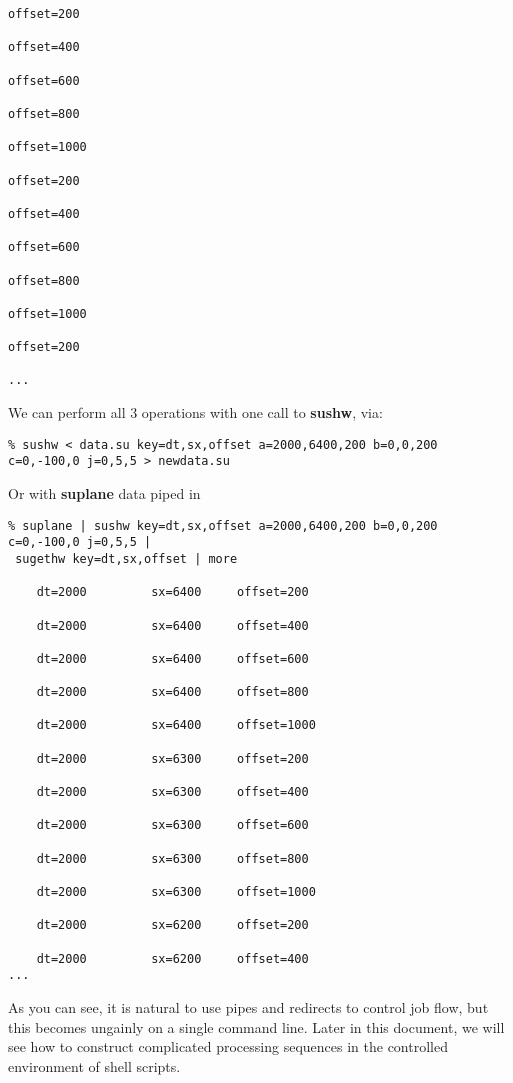{{{{\begin{verbatim}
offset=200      

offset=400      

offset=600      

offset=800      

offset=1000     

offset=200      

offset=400      

offset=600      

offset=800      

offset=1000     

offset=200      

...
\end{verbatim}} \noindent

We can perform all 3 operations with one call to {\bf sushw}, via:
{\small\begin{verbatim}
% sushw < data.su key=dt,sx,offset a=2000,6400,200 b=0,0,200 c=0,-100,0 j=0,5,5 > newdata.su
\end{verbatim}} \noindent
Or with {\bf suplane\/} data piped in
{\small\begin{verbatim}
% suplane | sushw key=dt,sx,offset a=2000,6400,200 b=0,0,200 c=0,-100,0 j=0,5,5 |
 sugethw key=dt,sx,offset | more

    dt=2000         sx=6400     offset=200      

    dt=2000         sx=6400     offset=400      

    dt=2000         sx=6400     offset=600      

    dt=2000         sx=6400     offset=800      

    dt=2000         sx=6400     offset=1000     

    dt=2000         sx=6300     offset=200      

    dt=2000         sx=6300     offset=400      

    dt=2000         sx=6300     offset=600      

    dt=2000         sx=6300     offset=800      

    dt=2000         sx=6300     offset=1000     

    dt=2000         sx=6200     offset=200      

    dt=2000         sx=6200     offset=400      
...
\end{verbatim}} \noindent
As you can see, it is natural to use pipes and redirects to control
job flow, but this becomes ungainly on a single command line.
Later in this document, we will see how to construct complicated
processing sequences in the controlled environment of shell scripts.

}}}
